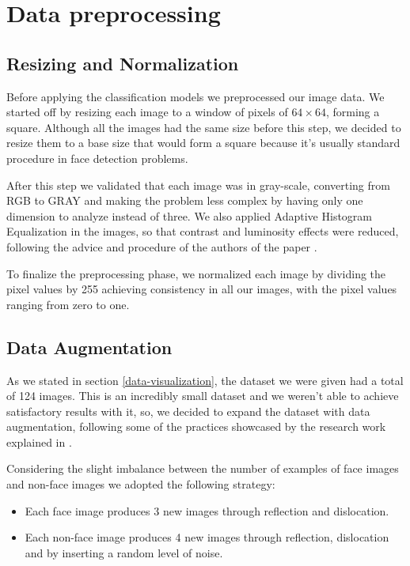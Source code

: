 \section{Data preprocessing}

\subsection{Resizing and Normalization}
Before applying the classification models we preprocessed our image data. We started off by resizing each image to a window of pixels of \(64 \times 64\), forming a square. Although all the images had the same size before this step, we decided to resize them to a base size that would form a square because it's usually standard procedure in face detection problems.

After this step we validated that each image was in gray-scale, converting from RGB to GRAY and making the problem less complex by having only one dimension to analyze instead of three. We also applied Adaptive Histogram Equalization in the images, so that contrast and luminosity effects were reduced, following the advice and procedure of the authors of the paper \cite{609310}.

To finalize the preprocessing phase, we normalized each image by dividing the pixel values by 255 achieving consistency in all our images, with the pixel values ranging from zero to one.

\subsection{Data Augmentation}
As we stated in section \ref{data-visualization}, the dataset we were given had a total of 124 images. This is an incredibly small dataset and we weren't able to achieve satisfactory results with it, so, we decided to expand the dataset with data augmentation, following some of the practices showcased by the research work explained in \cite{8858529}.

Considering the slight imbalance between the number of examples of face images and non-face images we adopted the following strategy:

\begin{itemize} 
\item Each face image produces 3 new images through reflection and dislocation.
\item Each non-face image produces 4 new images through reflection, dislocation and by inserting a random level of noise.
\end{itemize}

